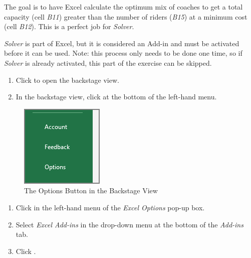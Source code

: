 The goal is to have Excel calculate the optimum mix of coaches to get a total capacity (cell \textit{B11}) greater than the number of riders (\textit{B15}) at a minimum cost (cell \textit{B12}). This is a perfect job for \textit{Solver}.

\textit{Solver} is part of Excel, but it is considered an Add-in and must be activated before it can be used. Note: this process only needs to be done one time, so if \textit{Solver} is already activated, this part of the exercise can be skipped.

\begin{enumerate}[resume]
	\item Click  to open the backstage view.
	\item In the backstage view, click  at the bottom of the left-hand menu.
	
\end{enumerate}

\begin{figure}[H]
\centering
\includegraphics[width=\maxwidth{.40\linewidth}]{gfx/ch08_fig70}
\caption{The Options Button in the Backstage View}
\label{08:fig70}
\end{figure}

\begin{enumerate}[resume]	
	
	\item Click  in the left-hand menu of the \textit{Excel Options} pop-up box.
	\item Select \textit{Excel Add-ins} in the drop-down menu at the bottom of the \textit{Add-ins} tab.
	\item Click .
	
\end{enumerate}

